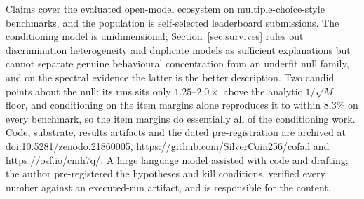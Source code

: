 \documentclass{article}
\begin{document}
Claims cover the evaluated open-model ecosystem on multiple-choice-style benchmarks, and the
population is self-selected leaderboard submissions. The conditioning model is unidimensional;
Section~\ref{sec:survives} rules out discrimination heterogeneity and duplicate models as
sufficient explanations but cannot separate genuine behavioural concentration from an underfit null
family, and on the spectral evidence the latter is the better description. Two candid points about
the null: its rms sits only $1.25$--$2.0\times$ above the analytic $1/\sqrt{M}$ floor, and
conditioning on the item margins alone reproduces it to within $8.3\%$ on every benchmark, so the
item margins do essentially all of the conditioning work. Code, substrate, results artifacts and the dated pre-registration are archived at
\href{https://doi.org/10.5281/zenodo.21860005}{doi:10.5281/zenodo.21860005},
\url{https://github.com/SilverCoin256/cofail} and \url{https://osf.io/cmh7q/}. A large language
model assisted with code and drafting; the author pre-registered the hypotheses and kill
conditions, verified every number against an executed-run artifact, and is responsible for the
content.
\end{document}
